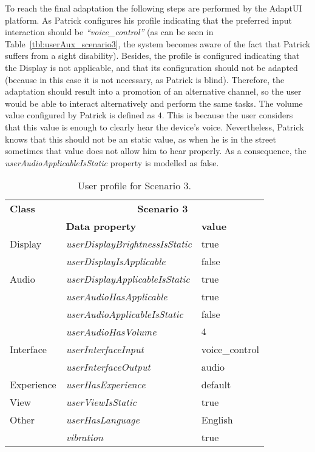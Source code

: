 To reach the final adaptation the following steps are performed by the AdaptUI
platform. As Patrick configures his profile indicating that the preferred input
interaction should be \textit{``voice\_control''} (as can be seen in 
Table~\ref{tbl:userAux_scenario3}, the system becomes aware of the fact that 
Patrick suffers from a sight disability). Besides, the profile is configured 
indicating that the Display is not applicable, and that its configuration 
should not be adapted (because in this case it is not necessary, as Patrick is 
blind). Therefore, the adaptation should result into a promotion of an 
alternative channel, so the user would be able to interact alternatively and 
perform the same tasks. The volume value configured by Patrick is defined as $4$. 
This is because the user considers that this value is enough to clearly hear 
the device's voice. Nevertheless, Patrick knows that this should not be an 
static value, as when he is in the street sometimes that value does not allow 
him to hear properly. As a consequence, the \textit{userAudioApplicableIsStatic}
property is modelled as false.

\begin{table}
 \caption{User profile for Scenario 3.}
 \label{tbl:user_profile_scenario3}
 \footnotesize
 \centering
\begin{tabular}{l l l}
  \hline 
  \textbf{Class}		& \multicolumn{2}{c}{\textbf{Scenario 3}}\\
		& \textbf{Data property} & \textbf{value}\\
  \hline
  Display 	& \textit{userDisplayBrightnessIsStatic}& true	\\
		& \textit{userDisplayIsApplicable} 	& false	\\
  Audio 	& \textit{userDisplayApplicableIsStatic}& true	\\
		& \textit{userAudioHasApplicable} 	& true	\\
		& \textit{userAudioApplicableIsStatic} 	& false	\\
		& \textit{userAudioHasVolume}  		& $4$ 	\\
  Interface 	& \textit{userInterfaceInput}		& voice\_control\\
		& \textit{userInterfaceOutput} 		& audio \\
  Experience	& \textit{userHasExperience} 		& default\\
  View		& \textit{userViewIsStatic}		& true	\\
  Other 	& \textit{userHasLanguage}		& English\\
		& \textit{vibration} 			& true 	\\
  \hline
\end{tabular}
\end{table}

